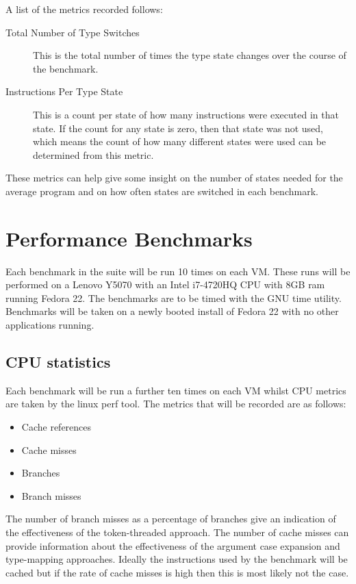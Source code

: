 \documentclass[english,a4paper,12pt]{report}
\begin{document}
A list of the metrics recorded follows:
\begin{description}
\item[Total Number of Type Switches] This is the total number of times
  the type state changes over the course of the benchmark.
\item[Instructions Per Type State] This is a count per state of how
  many instructions were executed in that state. If the count for any
  state is zero, then that state was not used, which means the count
  of how many different states were used can be determined from this
  metric.
\end{description}

These metrics can help give some insight on the number of states
needed for the average program and on how often states are switched in
each benchmark.


\section{Performance Benchmarks}

Each benchmark in the suite will be run 10 times on each VM. These
runs will be performed on a Lenovo Y5070 with an Intel i7-4720HQ CPU
with 8GB ram running Fedora 22. The benchmarks are to be timed with
the GNU time utility. Benchmarks will be taken on a newly booted
install of Fedora 22 with no other applications running.

\subsection{CPU statistics}

Each benchmark will be run a further ten times on each VM whilst CPU
metrics are taken by the linux perf tool. The metrics that will be
recorded are as follows:

\begin{itemize}
\item Cache references
\item Cache misses
\item Branches
\item Branch misses
\end{itemize}

The number of branch misses as a percentage of branches give an
indication of the effectiveness of the token-threaded approach. The
number of cache misses can provide information about the effectiveness
of the argument case expansion and type-mapping approaches. Ideally
the instructions used by the benchmark will be cached but if the rate
of cache misses is high then this is most likely not the case.
\end{document}
